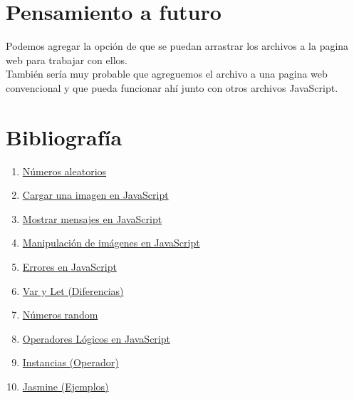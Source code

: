 \documentclass{article}
\begin{document}
\section{Pensamiento a futuro}
Podemos agregar la opción de que se puedan arrastrar los archivos a la pagina web para trabajar con ellos.\\
También sería muy probable que agreguemos el archivo a una pagina web convencional y que pueda funcionar ahí junto con otros archivos JavaScript.

\section*{Bibliografía}
\begin{enumerate}
    \item \href{https://developer.mozilla.org/es/docs/Web/JavaScript/Referencia/Objetos_globales/Math/random}{Números aleatorios}
    \item\href{https://es.stackoverflow.com/questions/164359/cargar-una-imagen-en-html-y-javascript}{Cargar una imagen en JavaScript}
    \item \href{https://www.anerbarrena.com/javascript-prompt-js-5509/}{Mostrar mensajes en JavaScript}
    \item \href{http://www.etnassoft.com/2016/11/03/manipulacion-de-imagenes-con-javascript-parte-1/?fbclid=IwAR0dXV2vw-8YteOKOKsElT3C-OfrEhC1JJJSqaNuM6Nv6codJGbA1KrKv80}{Manipulación de imágenes en JavaScript}
    \item \href{https://developer.mozilla.org/es/docs/Web/JavaScript/Referencia/Objetos_globales/Error}{Errores en JavaScript}
    \item \href{https://es.stackoverflow.com/questions/56116/cuando-conviene-utilizar-var-let-y-const-en-ecma-script-6}{Var y Let (Diferencias)}
    \item \href{https://developer.mozilla.org/es/docs/Web/JavaScript/Referencia/Objetos_globales/Math/random}{Números random}
    \item \href{https://developer.mozilla.org/es/docs/Web/JavaScript/Referencia/Operadores/Operadores_l\%C3\%B3gicos}{Operadores Lógicos en JavaScript}
    \item \href{https://developer.mozilla.org/es/docs/Web/JavaScript/Referencia/Operadores/instanceof}{Instancias (Operador)}
    \item \href{https://jasmine.github.io/2.0/introduction.html?catch=false}{Jasmine (Ejemplos)}
\end{enumerate}
\end{document}
